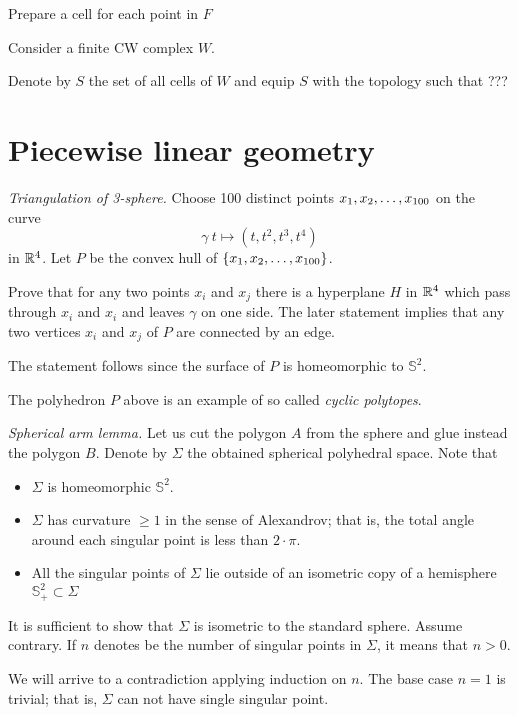 Prepare a cell for each point in $F$


Consider a finite CW complex $W$.

Denote by $S$ the set of all cells of $W$
and equip $S$ with the topology  such that ???


\section*{Piecewise linear geometry}


\textit{Triangulation of 3-sphere.}
Choose 100 distinct points $x_1,x_2,\z\dots,x_{100}$
on the curve 
\[\gamma\:t\mapsto (t,t^2,t^3,t^4)\] 
in $\mathbb{R}^4$.
Let $P$ be the convex hull of $\{x_1,x_2,\z\dots,x_{100}\}$.

Prove that for any two points $x_i$ and $x_j$ there is a hyperplane $H$ in $\mathbb{R}^4$ which pass through $x_i$ and $x_i$ and leaves $\gamma$ on one side.
The later statement implies that any two vertices $x_i$ and $x_j$
of $P$ are connected by an edge.

The statement follows
since the surface of $P$ is homeomorphic to $\mathbb{S}^2$.

 The polyhedron $P$ above is an example of so called \emph{cyclic polytopes}.

\textit{Spherical arm lemma.}
Let us cut the polygon $A$ from the sphere and glue instead the polygon $B$.
Denote by $\Sigma$ the obtained spherical polyhedral space.
Note that 
\begin{itemize}
\item $\Sigma$ is homeomorphic $\mathbb S^2$.
\item $\Sigma$ has curvature $\ge 1$ in the sense of Alexandrov; that is, the total angle around each singular point is less than $2\cdot \pi$.
\item All the singular points of $\Sigma$ 
lie outside of an isometric copy of a hemisphere $\mathbb{S}^2_+\subset \Sigma$
\end{itemize}

It is sufficient to show that $\Sigma$ is isometric to the standard sphere.
Assume contrary.
If $n$ denotes be the number of singular points in $\Sigma$, 
it means that $n>0$.

We will arrive to a contradiction applying induction on $n$.
The base case $n=1$ is trivial; 
that is, $\Sigma$ can not have single singular point.

